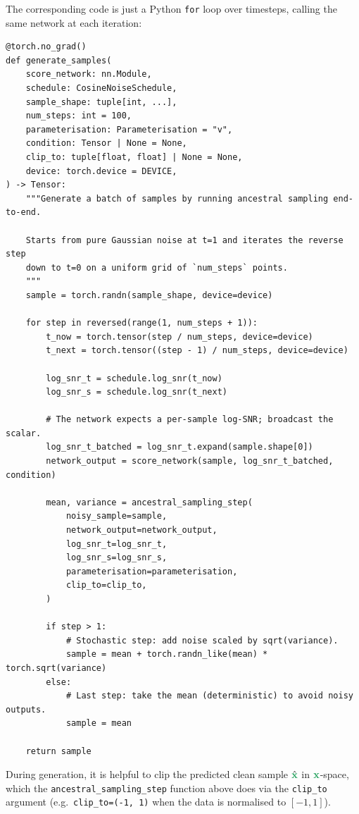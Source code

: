 \documentclass[usenames,dvipsnames]{article}
\newcommand{\myvec}[1]{\mathbf{#1}}
\newcommand{\vx}{\myvec{\textcolor{ForestGreen}{x}}}
\begin{document}
The corresponding code is just a Python \texttt{for} loop over timesteps, calling the same network at each iteration:

\begin{verbatim}
@torch.no_grad()
def generate_samples(
    score_network: nn.Module,
    schedule: CosineNoiseSchedule,
    sample_shape: tuple[int, ...],
    num_steps: int = 100,
    parameterisation: Parameterisation = "v",
    condition: Tensor | None = None,
    clip_to: tuple[float, float] | None = None,
    device: torch.device = DEVICE,
) -> Tensor:
    """Generate a batch of samples by running ancestral sampling end-to-end.

    Starts from pure Gaussian noise at t=1 and iterates the reverse step
    down to t=0 on a uniform grid of `num_steps` points.
    """
    sample = torch.randn(sample_shape, device=device)

    for step in reversed(range(1, num_steps + 1)):
        t_now = torch.tensor(step / num_steps, device=device)
        t_next = torch.tensor((step - 1) / num_steps, device=device)

        log_snr_t = schedule.log_snr(t_now)
        log_snr_s = schedule.log_snr(t_next)

        # The network expects a per-sample log-SNR; broadcast the scalar.
        log_snr_t_batched = log_snr_t.expand(sample.shape[0])
        network_output = score_network(sample, log_snr_t_batched, condition)

        mean, variance = ancestral_sampling_step(
            noisy_sample=sample,
            network_output=network_output,
            log_snr_t=log_snr_t,
            log_snr_s=log_snr_s,
            parameterisation=parameterisation,
            clip_to=clip_to,
        )

        if step > 1:
            # Stochastic step: add noise scaled by sqrt(variance).
            sample = mean + torch.randn_like(mean) * torch.sqrt(variance)
        else:
            # Last step: take the mean (deterministic) to avoid noisy outputs.
            sample = mean

    return sample
\end{verbatim}

During generation, it is helpful to clip the predicted clean sample $\hat{\vx}$ in $\vx$-space, which the \texttt{ancestral\_sampling\_step} function above does via the \texttt{clip\_to} argument (e.g.\ \texttt{clip\_to=(-1, 1)} when the data is normalised to $[-1, 1]$).
\end{document}
